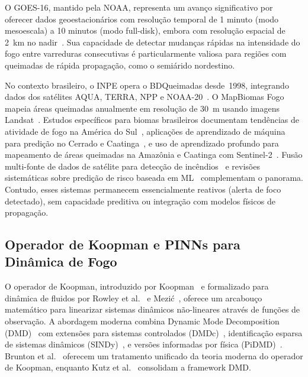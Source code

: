 \documentclass[preprint,times,numbers]{elsarticle}
\begin{document}
O GOES-16, mantido pela NOAA, representa um avanço significativo por oferecer dados geoestacionários com resolução temporal de 1 minuto (modo mesoescala) a 10 minutos (modo full-disk), embora com resolução espacial de 2~km no nadir~\cite{techreport:goes2022}. Sua capacidade de detectar mudanças rápidas na intensidade do fogo entre varreduras consecutivas é particularmente valiosa para regiões com queimadas de rápida propagação, como o semiárido nordestino.

No contexto brasileiro, o INPE opera o BDQueimadas desde~1998, integrando dados dos satélites AQUA, TERRA, NPP e NOAA-20~\cite{article:inpe2023}. O MapBiomas Fogo mapeia áreas queimadas anualmente em resolução de 30~m usando imagens Landsat~\cite{website:mapbiomas}. Estudos específicos para biomas brasileiros documentam tendências de atividade de fogo na América do Sul~\cite{article:mccarty2024}, aplicações de aprendizado de máquina para predição no Cerrado e Caatinga~\cite{article:alves2023}, e uso de aprendizado profundo para mapeamento de áreas queimadas na Amazônia e Caatinga com Sentinel-2~\cite{article:arruda2025}. Fusão multi-fonte de dados de satélite para detecção de incêndios~\cite{article:gargiulo2023} e revisões sistemáticas sobre predição de risco baseada em ML~\cite{article:hodzic2024} complementam o panorama. Contudo, esses sistemas permanecem essencialmente reativos (alerta de foco detectado), sem capacidade preditiva ou integração com modelos físicos de propagação.

\subsection{Operador de Koopman e PINNs para Dinâmica de Fogo}

O operador de Koopman, introduzido por Koopman~\cite{article:koopman1931} e formalizado para dinâmica de fluidos por Rowley et al.~\cite{article:rowley2009} e Mezić~\cite{article:mezic2013}, oferece um arcabouço matemático para linearizar sistemas dinâmicos não-lineares através de funções de observação. A abordagem moderna combina Dynamic Mode Decomposition (DMD)~\cite{article:schmid2010} com extensões para sistemas controlados (DMDc)~\cite{article:proctor2016}, identificação esparsa de sistemas dinâmicos (SINDy)~\cite{article:brunton2016sindy}, e versões informadas por física (PiDMD)~\cite{article:baddoo2023}. Brunton et al.~\cite{article:brunton2021} oferecem um tratamento unificado da teoria moderna do operador de Koopman, enquanto Kutz et al.~\cite{article:kutz2016} consolidam a framework DMD.
\end{document}
